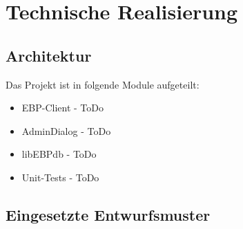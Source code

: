 \section{Technische Realisierung}

\subsection{Architektur}
Das Projekt ist in folgende Module aufgeteilt:
\begin{itemize}
	\item EBP-Client - ToDo
	\item AdminDialog - ToDo
	\item libEBPdb - ToDo
	\item Unit-Tests - ToDo
\end{itemize}

\newpage

\subsection{Eingesetzte Entwurfsmuster}
